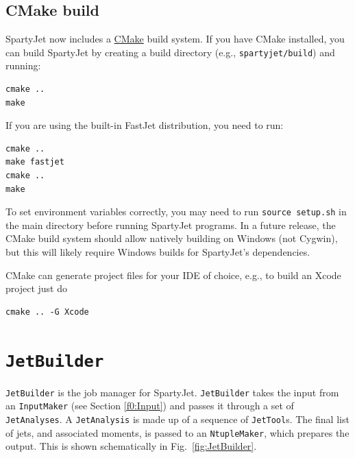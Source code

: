 \documentclass{article}
\newcommand{\prog}[1]{{\sc #1}\xspace}
\newcommand{\code}[1]{{\tt #1}\xspace}
\newcommand{\codes}[1]{{\tt #1}s\xspace}
\newcommand{\SJ}[0]{\prog{SpartyJet}}
\newcommand{\FJ}[0]{\prog{FastJet}}
\begin{document}
\subsection{CMake build}

\SJ now includes a  \href{http://cmake.org}{CMake} build system.  If you have CMake installed, you can build \SJ by creating a build directory (e.g., \verb+spartyjet/build+) and running:
\begin{verbatim}
cmake ..
make
\end{verbatim}
If you are using the built-in \FJ distribution, you need to run:
\begin{verbatim}
cmake ..
make fastjet
cmake ..
make
\end{verbatim}
To set environment variables correctly, you may need to run \verb+source setup.sh+ in the main directory before running \SJ programs.  In a future release, the CMake build system should allow natively building on Windows (not Cygwin), but this will likely require Windows builds for \SJ's dependencies.

CMake can generate project files for your IDE of choice, e.g., to build an Xcode project just do
\begin{verbatim}
cmake .. -G Xcode
\end{verbatim}


\section{\code{JetBuilder}}
\label{f0:jetbuilder}

\code{JetBuilder} is the job manager for \SJ.  \code{JetBuilder} takes the input from an \code{InputMaker} (see Section \ref{f0:Input}) and passes it through a set of \code{JetAnalyses}.  A \code{JetAnalysis} is made up of a sequence of \codes{JetTool}.  The final list of jets, and associated moments, is passed to an \code{NtupleMaker}, which prepares the output.  This is shown schematically in Fig.~\ref{fig:JetBuilder}.
\end{document}
